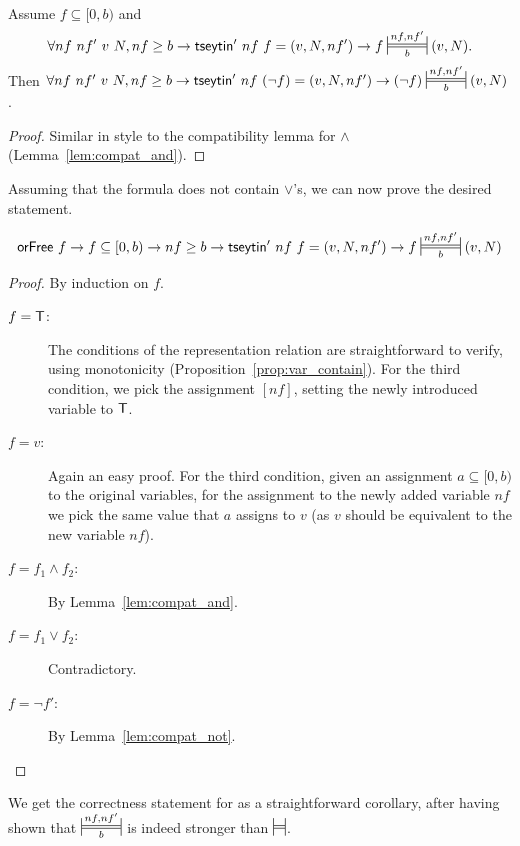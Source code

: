 \begin{lemma}\label{lem:compat_not}~\\
  Assume $f \subseteq [0, b)$ and 
  \[\forall nf~nf'~v~N, nf \ge b \rightarrow \tseytin'~nf~f = (v, N, nf') \rightarrow f \Frepr{nf}{nf'}{b} (v, N).\]
  Then 
  $\forall nf~nf'~v~N, nf \ge b \rightarrow \tseytin'~nf~(\lnot f) = (v, N, nf') \rightarrow (\lnot f) \Frepr{nf}{nf'}{b} (v, N)$. 
\end{lemma}
\begin{proof}
  Similar in style to the compatibility lemma for $\land$ (Lemma~\ref{lem:compat_and}).
\end{proof}

Assuming that the formula does not contain $\lor$'s, we can now prove the desired statement. 
\begin{theorem}
  \[\orFree~f \rightarrow f \subseteq [0, b) \rightarrow nf \ge b \rightarrow \tseytin'~nf~f = (v, N, nf') \rightarrow f \Frepr{nf}{nf'}{b} (v, N)\] 
\end{theorem}
\begin{proof}
  By induction on $f$.
  \begin{description}
    \item[$f = \mathsf{T}$:] The conditions of the representation relation are straightforward to verify, using monotonicity (Proposition~\ref{prop:var_contain}). For the third condition, we pick the assignment $[nf]$, setting the newly introduced variable to $\mathsf{T}$.
    \item[$f = v$:] Again an easy proof. For the third condition, given an assignment $a \subseteq [0, b)$ to the original variables, for the assignment to the newly added variable $nf$ we pick the same value that $a$ assigns to $v$ (as $v$ should be equivalent to the new variable $nf$). 
    \item[$f = f_1 \land f_2$:] By Lemma~\ref{lem:compat_and}.
    \item[$f = f_1 \lor f_2$:] Contradictory.
    \item[$f = \lnot f'$:] By Lemma~\ref{lem:compat_not}.
  \end{description}
\end{proof}

We get the correctness statement for \tseytin{} as a straightforward corollary, after having shown that $\Frepr{nf}{nf'}{b}$ is indeed stronger than $\frepr$.

